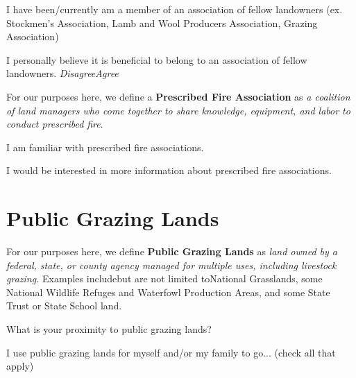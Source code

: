\documentclass[
  english,
  ]{sdapsclassic}
\begin{document}
\begin{questionnaire}
\begin{choicequestion}[cols=4]{I have been/currently am a member of an association of fellow landowners (ex. Stockmen's Association, Lamb and Wool Producers Association, Grazing Association)}
    \end{choicequestion}

     \begin{markgroup}{I personally believe it is beneficial to belong to an association of fellow landowners.}
      \markline{ }
 {\emph{Disagree}}{\emph{Agree}~~}~{}~{}
      \end{markgroup}

For our purposes here, we define a \textbf{Prescribed Fire Association} as \emph{a coalition of land managers who come together to share knowledge, equipment, and labor to conduct prescribed fire}. 
    
    \begin{choicequestion}[cols=4]{I am familiar with prescribed fire associations.}
    \end{choicequestion}    
    
    \begin{choicequestion}[cols=4]{I would be interested in more information about prescribed fire associations.}
    \end{choicequestion}    
    
\newpage 

 \section{Public Grazing Lands}
    
For our purposes here, we define \textbf{Public Grazing Lands} as \emph{land owned by a federal, state, or county agency managed for multiple uses, including livestock grazing.} 
Examples include\textemdash but are not limited to\textemdash National Grasslands, some National Wildlife Refuges and Waterfowl Production Areas, and some State Trust or State School land. 
    
    \begin{choicequestion}[cols=5]{What is your proximity to public grazing lands?}
    \end{choicequestion}
    
     \begin{markgroup}{I use public grazing lands for myself and/or my family to go... (check all that apply)}
    \end{markgroup}   
    

\end{questionnaire}
\end{document}
